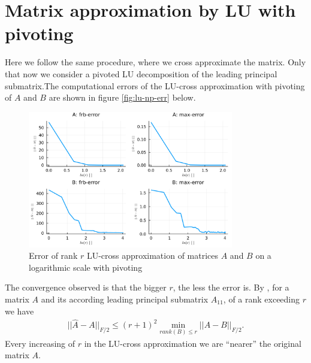 \documentclass[a4paper]{article}
\begin{document}
\section{Matrix approximation by LU with pivoting}
Here we follow the same procedure, where we cross approximate the matrix.
Only that now we consider a pivoted LU decomposition of the leading principal
submatrix.The computational errors of the LU-cross approximation with
pivoting of $A$ and $B$ are shown in figure \ref{fig:lu-np-err} below.
\begin{figure}[H]
    \centering
    \includegraphics[width=0.8\textwidth]{plots/lu-p-err.png}
    \caption{\label{fig:svd-err}Error of rank $r$ LU-cross approximation
    of matrices $A$ and $B$ on a logarithmic scale with pivoting}
\end{figure}
The convergence observed is that the bigger $r$, the less the error is.
By \cite{error-cross}, for a matrix $A$ and its according leading principal submatrix
$A_11$, of a rank exceeding $r$ we have
\begin{align}
    ||\hat{A}- A||_{F/2} \leq(r+1)^2 \min_{rank(B) \leq r} ||A - B||_{F/2}.
\end{align}
Every increasing of $r$ in the LU-cross approximation we are ``nearer'' the
original matrix $A$.
\end{document}
